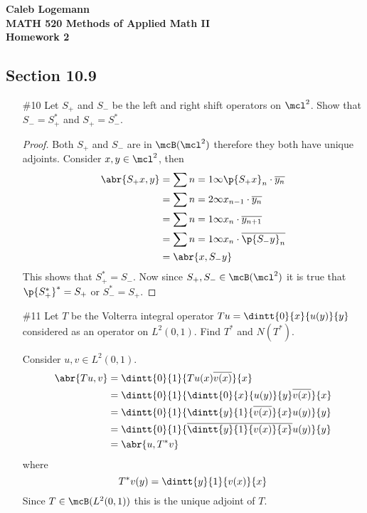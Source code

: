 \documentclass[11pt, oneside]{article}
\begin{document}
\noindent \textbf{\Large{Caleb Logemann \\
MATH 520 Methods of Applied Math II \\
Homework 2
}}

\subsection*{Section 10.9}
\begin{enumerate}
  \item[\#10] %
    Let $S_+$ and $S_-$ be the left and right shift operators on $\mcl^2$.
    Show that $S_- = S_+^*$ and $S_+=S_-^*$.

    \begin{proof}
      Both $S_+$ and $S_-$ are in $\mcB(\mcl^2)$ therefore they both have unique
      adjoints.
      Consider $x, y \in \mcl^2$, then
      \begin{align*}
        \abr{S_+ x, y} &= \sum{n = 1}{\infty}{\p{S_+ x}_n \cdot \overline{y_n}} \\
                       &= \sum{n = 2}{\infty}{x_{n - 1} \cdot \overline{y_n}} \\
                       &= \sum{n = 1}{\infty}{x_{n} \cdot \overline{y_{n+1}}} \\
                       &= \sum{n = 1}{\infty}{x_{n} \cdot \overline{\p{S_- y}_n}} \\
                       &= \abr{x, S_- y}
      \end{align*}
      This shows that $S_+^* = S_-$.
      Now since $S_+, S_- \in \mcB(\mcl^2)$ it is true that $\p{S_+^*}^* = S_+$
      or $S_-^* = S_+$.
    \end{proof}

  \pagebreak
  \item[\#11] %
    Let $T$ be the Volterra integral operator $Tu = \dintt{0}{x}{u(y)}{y}$
    considered as an operator on $L^2(0, 1)$.
    Find $T^*$ and $N(T^*)$.

    Consider $u, v \in L^2(0, 1)$.
    \begin{align*}
      \abr{Tu, v} &= \dintt{0}{1}{Tu(x) \overline{v(x)}}{x} \\
                  &= \dintt{0}{1}{\dintt{0}{x}{u(y)}{y} \overline{v(x)}}{x} \\
                  &= \dintt{0}{1}{\dintt{y}{1}{\overline{v(x)}}{x} u(y)}{y} \\
                  &= \dintt{0}{1}{\overline{\dintt{y}{1}{v(x)}{x}} u(y)}{y} \\
                  &= \abr{u, T^* v}
    \end{align*}
    where
    \[
      T^* v(y) = \dintt{y}{1}{v(x)}{x}
    \]
    Since $T \in \mcB(L^2(0, 1))$ this is the unique adjoint of $T$.


\end{enumerate}
\end{document}
